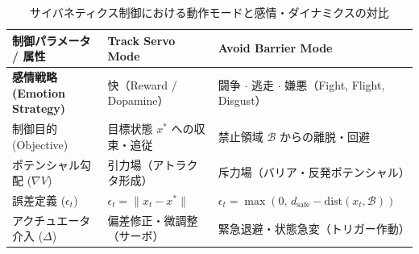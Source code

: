\begin{table}[htbp]
  \centering
  \small
  \caption{サイバネティクス制御における動作モードと感情・ダイナミクスの対比}
  \label{tab:servo_vs_barrier_modes}
  \begin{tabular*}{\linewidth}{@{\extracolsep{\fill}}lll@{}}
    \toprule
    \textbf{制御パラメータ / 属性} & \textbf{Track Servo Mode} & \textbf{Avoid Barrier Mode} \\
    \midrule
    \textbf{感情戦略 (Emotion Strategy)} & 快（Reward / Dopamine） & 闘争 $\cdot$ 逃走 $\cdot$ 嫌悪（Fight, Flight, Disgust） \\
    制御目的 (Objective)                 & 目標状態 $x^*$ への収束・追従 & 禁止領域 $\mathcal{B}$ からの離脱・回避 \\
    ポテンシャル勾配 ($\nabla V$)         & 引力場（アトラクタ形成）      & 斥力場（バリア・反発ポテンシャル） \\
    誤差定義 ($\epsilon_t$)              & $\epsilon_t = \| x_t - x^* \|$ & $\epsilon_t = \max(0, \, d_{\mathrm{safe}} - \mathrm{dist}(x_t, \mathcal{B}))$ \\
    アクチュエータ介入 ($\Delta$)        & 偏差修正・微調整（サーボ）    & 緊急退避・状態急変（トリガー作動） \\
    \bottomrule
  \end{tabular*}
\end{table}



